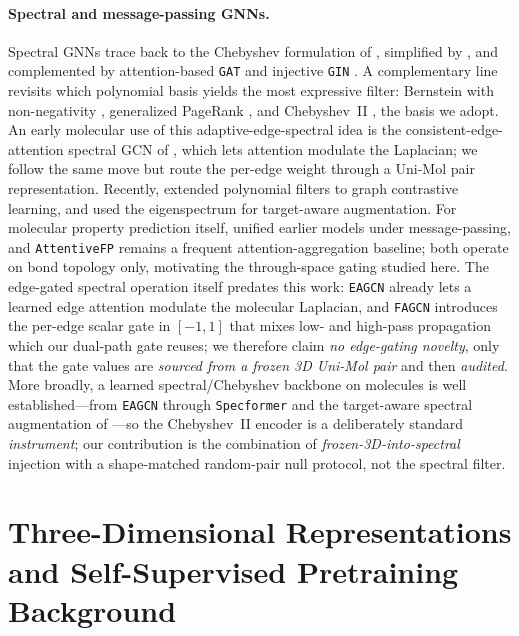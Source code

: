 \documentclass[sigconf,nonacm,anonymous,review]{acmart}
\begin{document}
\paragraph{Spectral and message-passing GNNs.}
Spectral GNNs trace back to the Chebyshev formulation of \citet{defferrard2016chebnet}, simplified by \citet{kipf2017gcn}, and complemented by attention-based \texttt{GAT} \citep{velickovic2018gat} and injective \texttt{GIN} \citep{xu2019gin}. A complementary line revisits which polynomial basis yields the most expressive filter: Bernstein with non-negativity \citep{he2021bernnet}, generalized PageRank \citep{chien2021gprgnn}, and Chebyshev~II \citep{he2022chebnetii}, the basis we adopt. An early molecular use of this adaptive-edge-spectral idea is the consistent-edge-attention spectral GCN of \citet{shang2021eagcn}, which lets attention modulate the Laplacian; we follow the same move but route the per-edge weight through a Uni-Mol pair representation. Recently, \citet{chen2024polygcl} extended polynomial filters to graph contrastive learning, and \citet{nogueira2025spectra} used the eigenspectrum for target-aware augmentation. For molecular property prediction itself, \citet{gilmer2017mpnn} unified earlier models under message-passing, and \texttt{AttentiveFP} \citep{xiong2020attentivefp} remains a frequent attention-aggregation baseline; both operate on bond topology only, motivating the through-space gating studied here.
The edge-gated spectral operation itself predates this work: \texttt{EAGCN}
\citep{shang2021eagcn} already lets a learned edge attention modulate the
molecular Laplacian, and \texttt{FAGCN} \citep{bo2021fagcn} introduces the
per-edge scalar gate in $[-1,1]$ that mixes low- and high-pass propagation which
our dual-path gate reuses; we therefore claim \emph{no edge-gating novelty}, only
that the gate values are \emph{sourced from a frozen 3D Uni-Mol pair} and then
\emph{audited}. More broadly, a learned spectral/Chebyshev backbone on molecules
is well established---from \texttt{EAGCN} \citep{shang2021eagcn} through
\texttt{Specformer} \citep{bo2023specformer} and the target-aware spectral
augmentation of \citet{nogueira2025spectra}---so the Chebyshev~II encoder is a
deliberately standard \emph{instrument}; our contribution is the combination of
\emph{frozen-3D-into-spectral} injection with a shape-matched random-pair null
protocol, not the spectral filter.

\section{Three-Dimensional Representations and Self-Supervised Pretraining Background}
\end{document}
